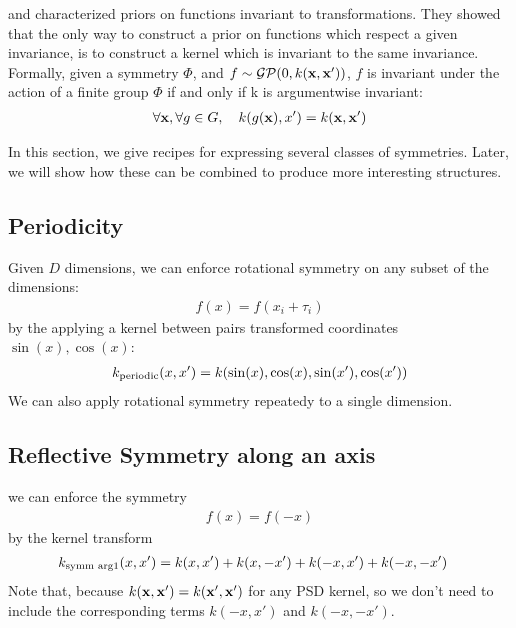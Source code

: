 

\citet{ginsbourger2012argumentwise} and \citet{Invariances13} characterized \gp{} priors on functions invariant to transformations.
They showed that the only way to construct a prior on functions which respect a given invariance, is to construct a kernel which is invariant to the same invariance.
Formally,
given a symmetry $\Phi$, and $f \sim \mathcal{GP}\!\left(0,k({\bf{x}},{\bf{x}}')\right)$, $f$ is invariant under the action of a finite group $\Phi$ if and only if k is argumentwise invariant:
%
\begin{align}
\forall {\bf{x}}, \forall g \in G, \quad k( g({\bf{x}}), x') = k({\bf{x}}, {\bf{x}}')
\end{align}

In this section, we give recipes for expressing several classes of symmetries.  Later, we will show how these can be combined to produce more interesting structures.


\subsection{Periodicity}
Given $D$ dimensions, we can enforce rotational symmetry on any subset of the dimensions:
%
\begin{align}
f(x) = f( x_i + \tau_i)%
\end{align}
%
by the applying a kernel between pairs transformed coordinates $\sin(x), \cos(x)$:
%
\begin{align}
k_{\textnormal{periodic}}(x, x') = k(\sin(x), \cos(x), \sin(x'), \cos(x'))
\end{align}
%
We can also apply rotational symmetry repeatedy to a single dimension.


\subsection{Reflective Symmetry along an axis}
we can enforce the symmetry
\begin{align}
f(x) = f( -x)
\end{align}
%
by the kernel transform
%
\begin{align}
k_{\textnormal{symm arg1}}(x, x') & = k(x, x') + k(x, -x') + k(-x, x') + k(-x, -x')
\end{align}
%
Note that, because $k({\bf{x}}, {\bf{x}}') = k({\bf{x}}', {\bf{x}}')$ for any PSD kernel, so we don't need to include the corresponding terms $k(-x, x')$ and $k(-x, -x')$.


